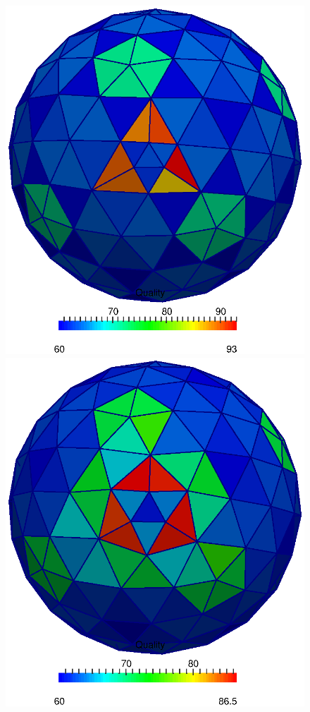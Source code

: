       \begin{figure}
        \begin{minipage}[t]{0.32\textwidth}
        \includegraphics[width=\textwidth]{bilder/meshCorrector/sphereDivBy4Before.eps}
        \end{minipage}
        \hfill
        \begin{minipage}[t]{0.32\textwidth}
        \includegraphics[width=\textwidth]{bilder/meshCorrector/sphereDivBy4AfterH01K1C07_1Step.eps}

\end{minipage}
\end{figure}
